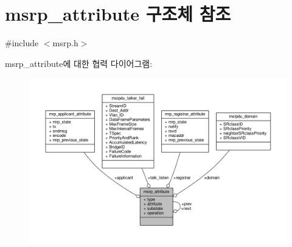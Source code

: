 \hypertarget{structmsrp__attribute}{}\section{msrp\+\_\+attribute 구조체 참조}
\label{structmsrp__attribute}


{\ttfamily \#include $<$msrp.\+h$>$}



msrp\+\_\+attribute에 대한 협력 다이어그램\+:
\nopagebreak
\begin{figure}[H]
\begin{center}
\leavevmode
\includegraphics[width=350pt]{structmsrp__attribute__coll__graph}
\end{center}
\end{figure}
